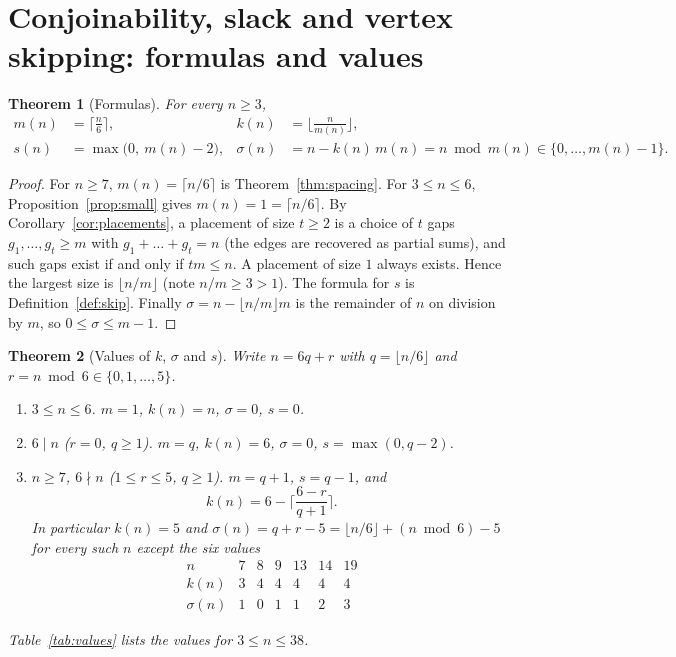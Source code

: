 \documentclass[11pt,a4paper]{article}
\newtheorem{theorem}{Theorem}[section]
\theoremstyle{definition}
\theoremstyle{remark}
\begin{document}
\section{Conjoinability, slack and vertex skipping: formulas and values}\label{sec:values}

\begin{theorem}[Formulas]\label{thm:ks}
For every $n\ge3$,
\[
\begin{aligned}
m(n)&=\Big\lceil\frac n6\Big\rceil, & k(n)&=\Big\lfloor\frac n{m(n)}\Big\rfloor,\\
s(n)&=\max\big(0,\ m(n)-2\big), & \sigma(n)&=n-k(n)\,m(n)=n\bmod m(n)\in\{0,\dots,m(n)-1\}.
\end{aligned}
\]
\end{theorem}
\begin{proof}
For $n\ge7$, $m(n)=\lceil n/6\rceil$ is Theorem~\ref{thm:spacing}. For $3\le n\le6$, Proposition~\ref{prop:small} gives $m(n)=1=\lceil n/6\rceil$.
By Corollary~\ref{cor:placements}, a placement of size $t\ge2$ is a choice of $t$ gaps $g_1,\dots,g_t\ge m$ with $g_1+\dots+g_t=n$ (the edges are recovered as partial sums), and such gaps exist if and only if $tm\le n$.
A placement of size $1$ always exists. Hence the largest size is $\lfloor n/m\rfloor$ (note $n/m\ge3>1$). The formula for $s$ is Definition~\ref{def:skip}.
Finally $\sigma=n-\lfloor n/m\rfloor m$ is the remainder of $n$ on division by $m$, so $0\le\sigma\le m-1$.
\end{proof}

\begin{theorem}[Values of $k$, $\sigma$ and $s$]\label{thm:values}
Write $n=6q+r$ with $q=\lfloor n/6\rfloor$ and $r=n\bmod6\in\{0,1,\dots,5\}$.
\begin{enumerate}[label=(\alph*)]
\item \emph{$3\le n\le6$.} $m=1$, $k(n)=n$, $\sigma=0$, $s=0$.
\item \emph{$6\mid n$ ($r=0$, $q\ge1$).} $m=q$, $k(n)=6$, $\sigma=0$, $s=\max(0,q-2)$.
\item \emph{$n\ge7$, $6\nmid n$ ($1\le r\le5$, $q\ge1$).} $m=q+1$, $s=q-1$, and
\[
k(n)=6-\Big\lceil\frac{6-r}{q+1}\Big\rceil .
\]
In particular $k(n)=5$ and $\sigma(n)=q+r-5=\lfloor n/6\rfloor+(n\bmod6)-5$ for every such $n$ \emph{except} the six values
\[
\begin{array}{c|cccccc}
n & 7 & 8 & 9 & 13 & 14 & 19\\\hline
k(n) & 3 & 4 & 4 & 4 & 4 & 4\\
\sigma(n) & 1 & 0 & 1 & 1 & 2 & 3
\end{array}
\]
\end{enumerate}
Table~\ref{tab:values} lists the values for $3\le n\le38$.
\end{theorem}
\end{document}
